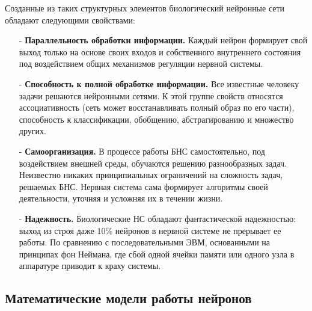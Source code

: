 Созданные из таких структурных элементов биологический нейронные сети обладают следующими свойствами:
\begin{itemize}
\item[-] {\bf Параллельность обработки информации. }
Каждый нейрон формирует свой выход только на основе своих входов и собственного внутреннего состояния под воздействием общих механизмов регуляции нервной системы.
\item[-] {\bf Способность к полной обработке информации. }
Все известные человеку задачи решаются нейронными сетями.
К этой группе свойств относятся ассоциативность (сеть может восстанавливать полный образ по его части), способность к классификации, обобщению, абстрагированию и множество других.
\item[-] {\bf Самоорганизация.}
В процессе работы БНС самостоятельно, под воздействием внешней среды, обучаются решению разнообразных задач.
Неизвестно никаких принципиальных ограничений на сложность задач, решаемых БНС.
Нервная система сама формирует алгоритмы своей деятельности, уточняя и усложняя их в течении жизни.
\item[-] {\bf Надежность. }
Биологические НС обладают фантастической надежностью: выход из строя даже 10\% нейронов в нервной системе не прерывает ее работы. 
По сравнению с последовательными ЭВМ, основанными на принципах фон Неймана, где сбой одной ячейки памяти или одного узла в аппаратуре приводит к краху системы.\cite{COURSE}
\end{itemize}

\subsection{Математические модели работы нейронов}
